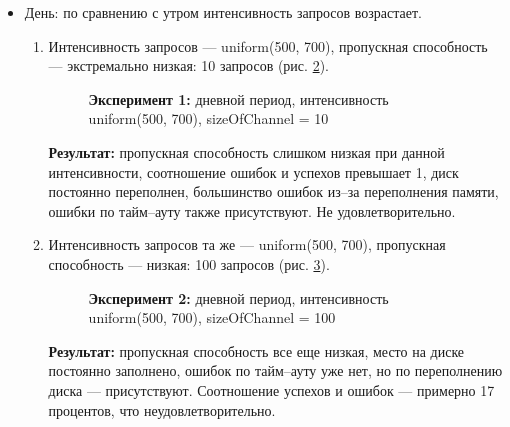 \begin{itemize}
\begin{enumerate}
        \newpage
        \item Интенсивность запросов та же --- uniform(100, 500), пропускная способность --- слишком высокая:
        171 запрос (рис. \ref{mor4}).
        \begin{figure} [h]
            \caption{\textbf{Эксперимент 4:} утренний период, интенсивность uniform(100, 500), sizeOfChannel = 171}
            \label{mor4}
        \end{figure}
        \textbf{Результат:} пропускная способность слишком велика, ошибок не происходит вообще,
        а на жесткий диск запросы не попадают. Не удовлетворительно, поскольку тех же результатов 
        можно добиться с меньшей пропускной способностью.
    \end{enumerate}

    \item День: по сравнению с утром интенсивность запросов возрастает.
     \begin{enumerate}
        \item Интенсивность запросов --- uniform(500, 700), пропускная способность --- экстремально низкая:
        10 запросов (рис. \ref{aft1}).
        \begin{figure} [h]
            \caption{\textbf{Эксперимент 1:} дневной период, интенсивность uniform(500, 700), sizeOfChannel = 10}
            \label{aft1}
        \end{figure}
        \textbf{Результат:} пропускная способность слишком низкая при данной
        интенсивности, соотношение ошибок и успехов превышает 1, диск постоянно переполнен, большинство
        ошибок из--за переполнения памяти, ошибки по тайм--ауту также присутствуют. Не удовлетворительно.

        \newpage
        \item Интенсивность запросов та же --- uniform(500, 700), пропускная способность --- низкая:
        100 запросов (рис. \ref{aft2}).
        \begin{figure} [h]
            \caption{\textbf{Эксперимент 2:} дневной период, интенсивность uniform(500, 700), sizeOfChannel = 100}
            \label{aft2}
        \end{figure}
        \textbf{Результат:} пропускная способность все еще низкая,
        место на диске постоянно заполнено, ошибок по тайм--ауту уже нет, но по переполнению диска --- присутствуют.
        Соотношение успехов и ошибок --- примерно 17 процентов, что неудовлетворительно.


\end{enumerate}
\end{itemize}
